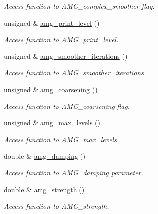 \begin{DoxyCompactItemize}
\begin{DoxyCompactList}\small\item\em Access function to A\+M\+G\+\_\+complex\+\_\+smoother flag. \end{DoxyCompactList}\item 
unsigned \& \hyperlink{classoomph_1_1HypreSolver_a3bbf531d61b2ac2a0365f1d7c1ed58b7}{amg\+\_\+print\+\_\+level} ()
\begin{DoxyCompactList}\small\item\em Access function to A\+M\+G\+\_\+print\+\_\+level. \end{DoxyCompactList}\item 
unsigned \& \hyperlink{classoomph_1_1HypreSolver_acd44bfa532703a7a60ca538531e6ee09}{amg\+\_\+smoother\+\_\+iterations} ()
\begin{DoxyCompactList}\small\item\em Access function to A\+M\+G\+\_\+smoother\+\_\+iterations. \end{DoxyCompactList}\item 
unsigned \& \hyperlink{classoomph_1_1HypreSolver_a5ed32fd8b3540cd863c30a76da15b0cb}{amg\+\_\+coarsening} ()
\begin{DoxyCompactList}\small\item\em Access function to A\+M\+G\+\_\+coarsening flag. \end{DoxyCompactList}\item 
unsigned \& \hyperlink{classoomph_1_1HypreSolver_a9f654a31fed47b7ef941c407518545f9}{amg\+\_\+max\+\_\+levels} ()
\begin{DoxyCompactList}\small\item\em Access function to A\+M\+G\+\_\+max\+\_\+levels. \end{DoxyCompactList}\item 
double \& \hyperlink{classoomph_1_1HypreSolver_a0d1cd41ca27ea448f4c07e276b223cff}{amg\+\_\+damping} ()
\begin{DoxyCompactList}\small\item\em Access function to A\+M\+G\+\_\+damping parameter. \end{DoxyCompactList}\item 
double \& \hyperlink{classoomph_1_1HypreSolver_af49d2527d5d66f349d970f2f161a61a2}{amg\+\_\+strength} ()
\begin{DoxyCompactList}\small\item\em Access function to A\+M\+G\+\_\+strength. \end{DoxyCompactList}\item 

\end{DoxyCompactItemize}

